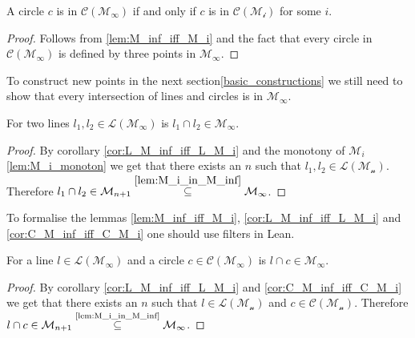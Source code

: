 \begin{corollary}
    \label{cor:C_M_inf_iff_C_M_i}
    \leanok
    A circle $c$ is in $\mathcal{C(M_{\infty})}$ if and only if $c$ is in $\mathcal{C(M_i)}$ for some $i$.
\end{corollary}
\begin{proof}
    \leanok
    Follows from \ref{lem:M_inf_iff_M_i} and the fact that every circle in $\mathcal{C(M_{\infty})}$ is defined by three points in $\mathcal{M_{\infty}}$.
\end{proof}

To construct new points in the next section\ref{basic_constructions} we still need to show that every intersection of lines and circles is in $\mathcal{M}_{\infty}$.
\begin{lemma}
    \label{lem:ill_M_inf}
    \leanok
    For two lines $l_1, l_2 \in \mathcal{L(M_{\infty})}$ is $l_1 \cap l_2 \in \mathcal{M}_{\infty}$.
\end{lemma}
\begin{proof}
    \leanok
    By corollary \ref{cor:L_M_inf_iff_L_M_i} and the monotony of $\mathcal{M}_i$ \ref{lem:M_i_monoton} we get that there exists an $n$ such that $l_1, l_2 \in \mathcal{L(M_n)}$.
    Therefore $l_1 \cap l_2 \in \mathcal{M}_{n+1} \stackrel{\ref{lem:M_i_in_M_inf}}{\subseteq} \mathcal{M}_{\infty}$.
\end{proof}

\begin{remark}%
    To formalise the lemmas \ref{lem:M_inf_iff_M_i}, \ref{cor:L_M_inf_iff_L_M_i} and \ref{cor:C_M_inf_iff_C_M_i} one should use filters in Lean.
\end{remark}

\begin{lemma}
    \label{lem:ilc_M_inf}
    \leanok
    For a line $l \in \mathcal{L(M_{\infty})}$ and a circle $c \in \mathcal{C(M_{\infty})}$ is $l \cap c \in \mathcal{M}_{\infty}$.
\end{lemma}
\begin{proof}
    \leanok
    By corollary \ref{cor:L_M_inf_iff_L_M_i} and \ref{cor:C_M_inf_iff_C_M_i} we get that there exists an $n$ such that $l \in \mathcal{L(M_n)}$ and $c \in \mathcal{C(M_n)}$.
    Therefore $l \cap c \in \mathcal{M}_{n+1} \stackrel{\text{\ref{lem:M_i_in_M_inf}}}{\subseteq} \mathcal{M}_{\infty}$.
\end{proof}

